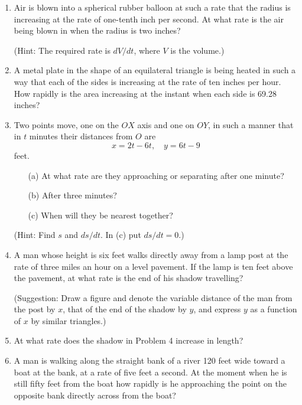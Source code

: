 \begin{enumerate}
    \item Air is blown into a spherical rubber balloon at such a rate that the radius is increasing at the rate of one-tenth inch per second. At what rate is the air being blown in when the radius is two inches? 
    
    (Hint: The required rate is $dV/dt$, where $V$ is the volume.)

    \item A metal plate in the shape of an equilateral triangle is being heated in such a way that each of the sides is increasing at the rate of ten inches per hour. How rapidly is the area increasing at the instant when each side is 69.28 inches?

    \item Two points move, one on the $OX$ axis and one on $OY$, in such a manner that in $t$ minutes their distances from $O$ are
    \[x = 2t - 6t, \quad y = 6t - 9\]
    feet.
    \begin{enumerate}
        \item[(a)] At what rate are they approaching or separating after one minute?
        \item[(b)] After three minutes?
        \item[(c)] When will they be nearest together?
    \end{enumerate}
    (Hint: Find $s$ and $ds/dt$. In (c) put $ds/dt = 0$.)

    \item A man whose height is six feet walks directly away from a lamp post at the rate of three miles an hour on a level pavement. If the lamp is ten feet above the pavement, at what rate is the end of his shadow travelling?
    
    (Suggestion: Draw a figure and denote the variable distance of the man from the post by $x$, that of the end of the shadow by $y$, and express $y$ as a function of $x$ by similar triangles.)

    \item At what rate does the shadow in Problem 4 increase in length?

    \item A man is walking along the straight bank of a river 120 feet wide toward a boat at the bank, at a rate of five feet a second. At the moment when he is still fifty feet from the boat how rapidly is he approaching the point on the opposite bank directly across from the boat?
    

\end{enumerate}

